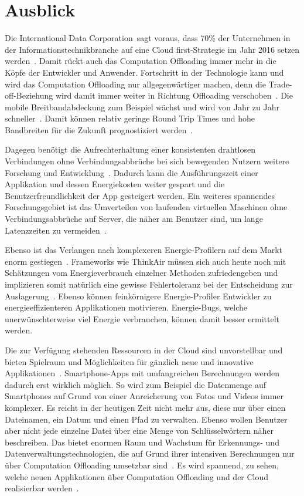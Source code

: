 \documentclass{sigchi}
\begin{document}
\section{Ausblick}

Die \glqq International Data Corporation\grqq\ sagt voraus, dass 70\% der Unternehmen in der Informationstechnikbranche auf eine \glqq Cloud first\grqq-Strategie im Jahr 2016 setzen werden~\cite{thoughtsoncloud}.
Damit rückt auch das Computation Offloading immer mehr in die Köpfe der Entwickler und Anwender.
Fortschritt in der Technologie kann und wird das Computation Offloading nur allgegenwärtiger machen, denn die Trade-off-Beziehung wird damit immer weiter in Richtung Offloading verschoben~\cite{o12}.
Die mobile Breitbandabdeckung zum Beispiel wächst und wird von Jahr zu Jahr schneller~\cite{thoughtsoncloud, thinkair}.
Damit können relativ geringe Round Trip Times und hohe Bandbreiten für die Zukunft prognostiziert werden~\cite{thinkair}.

Dagegen benötigt die Aufrechterhaltung einer konsistenten drahtlosen Verbindungen ohne Verbindungsabbrüche bei sich bewegenden Nutzern weitere Forschung und Entwicklung~\cite{o11}.
Dadurch kann die Ausführungszeit einer Applikation und dessen Energiekosten weiter gespart und die Benutzerfreundlichkeit der App gesteigert werden.
Ein weiteres spannendes Forschungsgebiet ist das Umverteilen von laufenden virtuellen Maschinen ohne Verbindungsabbrüche auf Server, die näher am Benutzer sind, um lange Latenzzeiten zu vermeiden~\cite{o11}.

Ebenso ist das Verlangen nach komplexeren Energie-Profilern auf dem Markt enorm gestiegen~\cite{o12}.
Frameworks wie ThinkAir müssen sich auch heute noch mit Schätzungen vom Energieverbrauch einzelner Methoden zufriedengeben und implizieren somit natürlich eine gewisse Fehlertoleranz bei der Entscheidung zur Auslagerung~\cite{thinkair}.
Ebenso können feinkörnigere Energie-Profiler Entwickler zu energieeffizienteren Applikationen motivieren.
Energie-Bugs, welche unerwünschterweise viel Energie verbrauchen, können damit besser ermittelt werden.

Die zur Verfügung stehenden Ressourcen in der Cloud sind unvorstellbar und bieten Spielraum und Möglichkeiten für gänzlich neue und innovative Applikationen~\cite{o12}.
Smartphone-Apps mit umfangreichen Berechnungen werden dadurch erst wirklich möglich.
So wird zum Beispiel die Datenmenge auf Smartphones auf Grund von einer Anreicherung von Fotos und Videos immer komplexer.
Es reicht in der heutigen Zeit nicht mehr aus, diese nur über einen Dateinamen, ein Datum und einen Pfad zu verwalten.
Ebenso wollen Benutzer aber nicht jede einzelne Datei über eine Menge von Schlüsselwörtern näher beschreiben.
Das bietet enormen Raum und Wachstum für Erkennungs- und Datenverwaltungstechnologien, die auf Grund ihrer intensiven Berechnungen nur über Computation Offloading umsetzbar sind~\cite{o12}.
Es wird spannend, zu sehen, welche neuen Applikationen über Computation Offloading und der Cloud realisierbar werden~\cite{o12}.



\end{document}
